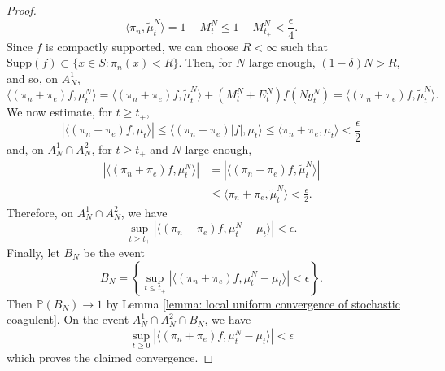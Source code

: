 \begin{proof}
\begin{equation}
    \langle \pi_n, \widetilde{\mu}^N_t\rangle =1-M^N_t \leq 1-M^N_{t_+} <\frac{\epsilon}{4}.
\end{equation} Since $f$ is compactly supported, we can choose $R<\infty$ such that $\text{Supp}(f)\subset \{x\in S: \pi_n(x)<R\}$. Then, for $N$ large enough, $(1-\delta)N>R$, and so, on $A^1_N$, \begin{equation}
    \langle (\pi_n+\pi_e)f,\mu^N_t\rangle = \langle (\pi_n+\pi_e)f,\widetilde{\mu}^N_t\rangle+(M^N_t+E^N_t)f(Ng^N_t) =  \langle (\pi_n+\pi_e)f,\widetilde{\mu}^N_t\rangle.
\end{equation} We now estimate, for $t\geq t_+$, \begin{equation}
    |\langle (\pi_n+\pi_e)f, \mu_t\rangle|\leq \langle (\pi_n+\pi_e)|f|, \mu_t\rangle \leq \langle \pi_n+\pi_e, \mu_t\rangle <\frac{\epsilon}{2}
\end{equation} and, on $A^1_N\cap A^2_N$, for $t\geq t_+$  and $N$ large enough, \begin{equation} \begin{split}
    |\langle (\pi_n+\pi_e)f, \mu^N_t\rangle|&=|\langle (\pi_n+\pi_e)f, \widetilde{\mu}^N_t\rangle | \\ & \leq \langle \pi_n+\pi_e, \widetilde{\mu}^N_t\rangle <\frac{\epsilon}{2}.   \end{split}
\end{equation} Therefore, on $A^1_N\cap A^2_N$, we have \begin{equation}
    \sup_{t\geq t_+}|\langle (\pi_n+\pi_e)f, \mu^N_t-\mu_t\rangle| <\epsilon.
\end{equation} Finally, let $B_N$ be the event \begin{equation}
    B_N=\left\{\sup_{t\leq t_+} |\langle (\pi_n+\pi_e)f, \mu^N_t-\mu_t\rangle |<\epsilon\right\}.
\end{equation} Then $\mathbb{P}(B_N)\rightarrow 1$ by Lemma \ref{lemma: local uniform convergence of stochastic coagulent}. On the event $A^1_N\cap A^2_N\cap B_N$, we have \begin{equation}
    \sup_{t\geq 0} |\langle (\pi_n+\pi_e)f, \mu^N_t-\mu_t\rangle |<\epsilon
\end{equation} which proves the claimed convergence.
\end{proof}